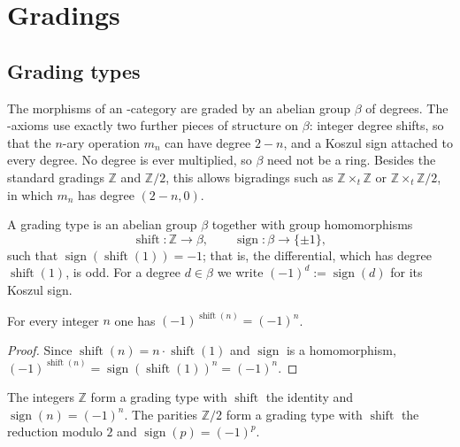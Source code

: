 
\chapter{Gradings}

\section{Grading types}

The morphisms of an \Ainf{}-category are graded by an abelian group $\beta$ of
degrees. The \Ainf{}-axioms use exactly two further pieces of structure on
$\beta$: integer degree shifts, so that the $n$-ary operation $m_n$ can have
degree $2-n$, and a Koszul sign attached to every degree. No degree is ever
multiplied, so $\beta$ need not be a ring. Besides the standard gradings
$\mathbb{Z}$ and $\mathbb{Z}/2$, this allows bigradings such as
$\mathbb{Z}\times_t\mathbb{Z}$ or $\mathbb{Z}\times_t\mathbb{Z}/2$, in which $m_n$
has degree $(2-n,0)$.

\begin{definition}
\label{AInfinityTheory.Grading}
\leanok
A grading type is an abelian group $\beta$ together with group homomorphisms
\[
  \operatorname{shift} : \mathbb{Z} \to \beta,
  \qquad
  \operatorname{sign} : \beta \to \{\pm 1\},
\]
such that $\operatorname{sign}(\operatorname{shift}(1)) = -1$; that is, the
differential, which has degree $\operatorname{shift}(1)$, is odd. For a degree
$d \in \beta$ we write $(-1)^d := \operatorname{sign}(d)$ for its Koszul sign.
\end{definition}

\begin{lemma}
\label{AInfinityTheory.sign_shift}
\leanok
{}
For every integer $n$ one has $(-1)^{\operatorname{shift}(n)} = (-1)^n$.
\end{lemma}
\begin{proof}
\leanok
Since $\operatorname{shift}(n) = n \cdot \operatorname{shift}(1)$ and
$\operatorname{sign}$ is a homomorphism,
$(-1)^{\operatorname{shift}(n)} = \operatorname{sign}(\operatorname{shift}(1))^n = (-1)^n$.
\end{proof}

\begin{definition}
\label{AInfinityTheory.Grading.standard}
\leanok
{}
The integers $\mathbb{Z}$ form a grading type with $\operatorname{shift}$ the
identity and $\operatorname{sign}(n) = (-1)^n$. The parities $\mathbb{Z}/2$
form a grading type with $\operatorname{shift}$ the reduction modulo $2$ and
$\operatorname{sign}(p) = (-1)^p$.
\end{definition}

